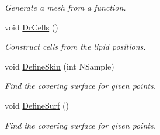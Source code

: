 \begin{DoxyCompactItemize}
\begin{DoxyCompactList}\small\item\em Generate a mesh from a function. \end{DoxyCompactList}\item 
void \hyperlink{classElPoly_a17706f0576f3b5d93c03ac3a5dd3dcef}{Dr\+Cells} ()\hypertarget{classElPoly_a17706f0576f3b5d93c03ac3a5dd3dcef}{}\label{classElPoly_a17706f0576f3b5d93c03ac3a5dd3dcef}

\begin{DoxyCompactList}\small\item\em Construct cells from the lipid positions. \end{DoxyCompactList}\item 
void \hyperlink{classElPoly_a6b5e62f460bcb738295e940da6ddf784}{Define\+Skin} (int N\+Sample)\hypertarget{classElPoly_a6b5e62f460bcb738295e940da6ddf784}{}\label{classElPoly_a6b5e62f460bcb738295e940da6ddf784}

\begin{DoxyCompactList}\small\item\em Find the covering surface for given points. \end{DoxyCompactList}\item 
void \hyperlink{classElPoly_a7c082f4da2c0b68b41f525df0173519c}{Define\+Surf} ()\hypertarget{classElPoly_a7c082f4da2c0b68b41f525df0173519c}{}\label{classElPoly_a7c082f4da2c0b68b41f525df0173519c}

\begin{DoxyCompactList}\small\item\em Find the covering surface for given points. \end{DoxyCompactList}\end{DoxyCompactItemize}
